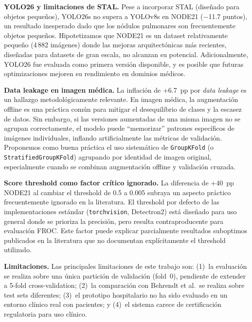\documentclass[conference]{IEEEtran}
\begin{document}
\textbf{YOLO26 y limitaciones de STAL.}
Pese a incorporar STAL (dise\~{n}ado para objetos peque\~{n}os), YOLO26s no
supera a YOLOv8s en NODE21 ($-$11.7 puntos), un resultado inesperado dado que
los n\'{o}dulos pulmonares son frecuentemente objetos peque\~{n}os.
Hipotetizamos que NODE21 es un dataset relativamente peque\~{n}o (4\,882
im\'{a}genes) donde las mejoras arquitect\'{o}nicas m\'{a}s recientes,
dise\~{n}adas para datasets de gran escala, no alcanzan su potencial.
Adicionalmente, YOLO26 fue evaluada como primera versi\'{o}n disponible, y es
posible que futuras optimizaciones mejoren su rendimiento en dominios
m\'{e}dicos.

\textbf{Data leakage en imagen m\'{e}dica.}
La inflaci\'{o}n de +6.7~pp por \textit{data leakage} es un hallazgo
metodol\'{o}gicamente relevante. En imagen m\'{e}dica, la augmentaci\'{o}n
offline es una pr\'{a}ctica com\'{u}n para mitigar el desequilibrio de clases
y la escasez de datos. Sin embargo, si las versiones aumentadas de una misma
imagen no se agrupan correctamente, el modelo puede ``memorizar'' patrones
espec\'{i}ficos de im\'{a}genes individuales, inflando artificialmente las
m\'{e}tricas de validaci\'{o}n. Proponemos como buena pr\'{a}ctica el uso
sistem\'{a}tico de \texttt{GroupKFold} (o \texttt{StratifiedGroupKFold})
agrupando por identidad de imagen original, especialmente cuando se combinan
augmentaci\'{o}n offline y validaci\'{o}n cruzada.

\textbf{Score threshold como factor cr\'{i}tico ignorado.}
La diferencia de +40~pp NODE21 al cambiar el threshold de 0.5 a 0.005
subraya un aspecto pr\'{a}ctico frecuentemente ignorado en la literatura. El
threshold por defecto de las implementaciones est\'{a}ndar
(\texttt{torchvision}, Detectron2) est\'{a} dise\~{n}ado para uso general
donde se prioriza la precisi\'{o}n, pero resulta contraproducente para
evaluaci\'{o}n FROC. Este factor puede explicar parcialmente resultados
suboptimos publicados en la literatura que no documentan expl\'{i}citamente
el threshold utilizado.

\textbf{Limitaciones.}
Las principales limitaciones de este trabajo son: (1)~la evaluaci\'{o}n se
realiza sobre una \'{u}nica partici\'{o}n de validaci\'{o}n (fold~0),
pendiente de extender a 5-fold cross-validation; (2)~la comparaci\'{o}n con
Behrendt et al.\ se realiza sobre test sets diferentes; (3)~el prototipo
hospitalario no ha sido evaluado en un entorno cl\'{i}nico real con
pacientes; y (4)~el sistema carece de certificaci\'{o}n regulatoria para uso
cl\'{i}nico.
\end{document}
